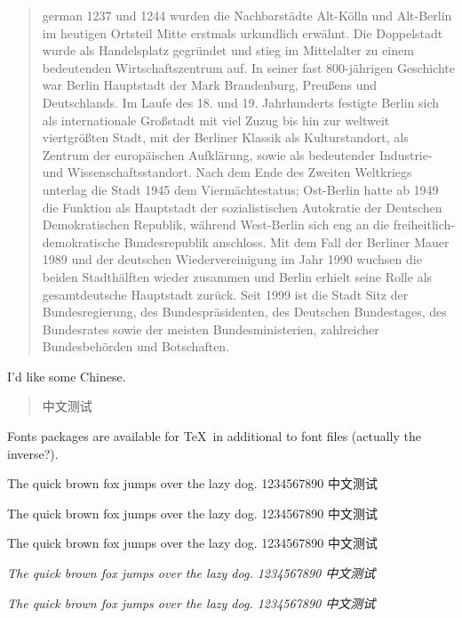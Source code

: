 \documentclass[a4paper,12pt]{article}
\newcommand{\pangram}[1][\rmfamily]{{#1 The quick brown fox jumps
over the lazy dog. 1234567890 \foreignlanguage{chinese}{中文测试}}\par}
\begin{document}
\begin{quotation}
\begin{otherlanguage*}{german}
  1237 und 1244 wurden die Nachbarstädte Alt-Kölln und Alt-Berlin im heutigen Ortsteil Mitte erstmals urkundlich erwähnt. Die Doppelstadt wurde als Handelsplatz gegründet und stieg im Mittelalter zu einem bedeutenden Wirtschaftszentrum auf. In seiner fast 800-jährigen Geschichte war Berlin Hauptstadt der Mark Brandenburg, Preußens und Deutschlands. Im Laufe des 18. und 19. Jahrhunderts festigte Berlin sich als internationale Großstadt mit viel Zuzug bis hin zur weltweit viertgrößten Stadt, mit der Berliner Klassik als Kulturstandort, als Zentrum der europäischen Aufklärung, sowie als bedeutender Industrie- und Wissenschaftsstandort. Nach dem Ende des Zweiten Weltkriegs unterlag die Stadt 1945 dem Viermächtestatus; Ost-Berlin hatte ab 1949 die Funktion als Hauptstadt der sozialistischen Autokratie der Deutschen Demokratischen Republik, während West-Berlin sich eng an die freiheitlich-demokratische Bundesrepublik anschloss. Mit dem Fall der Berliner Mauer 1989 und der deutschen Wiedervereinigung im Jahr 1990 wuchsen die beiden Stadthälften wieder zusammen und Berlin erhielt seine Rolle als gesamtdeutsche Hauptstadt zurück. Seit 1999 ist die Stadt Sitz der Bundesregierung, des Bundespräsidenten, des Deutschen Bundestages, des Bundesrates sowie der meisten Bundesministerien, zahlreicher Bundesbehörden und Botschaften.
\end{otherlanguage*}
\end{quotation}

I'd like some Chinese.


\begin{quotation}
\foreignlanguage{chinese}{中文测试}
\end{quotation}

Fonts packages are available for \TeX\ in additional to font files (actually the inverse?).

\pangram[\rmfamily]
\pangram[\sffamily]
\pangram[\ttfamily]
\pangram[\itshape]
\pangram[\slshape]
\end{document}

